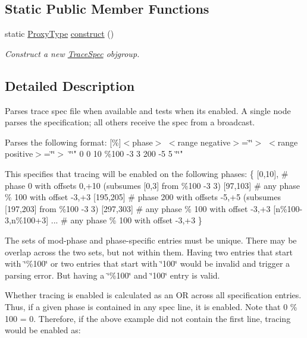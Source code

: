 \subsection*{Static Public Member Functions}
\begin{DoxyCompactItemize}
\item 
static \hyperlink{structvt_1_1trace_1_1file__spec_1_1_trace_spec_a26160cff9bb5115866943ed823405f1f}{Proxy\+Type} \hyperlink{structvt_1_1trace_1_1file__spec_1_1_trace_spec_a66e362b05b4af9a4e4ef514a4e272599}{construct} ()
\begin{DoxyCompactList}\small\item\em Construct a new {\ttfamily \hyperlink{structvt_1_1trace_1_1file__spec_1_1_trace_spec}{Trace\+Spec}} objgroup. \end{DoxyCompactList}\end{DoxyCompactItemize}


\subsection{Detailed Description}
Parses trace spec file when available and tests when its enabled. A single node parses the specification; all others receive the spec from a broadcast. 

Parses the following format\+: \mbox{[}\%\mbox{]}$<$phase$>$ $<$range negative$>$=\char`\"{}\char`\"{}$>$ $<$range positive$>$=\char`\"{}\char`\"{}$>$ \char`\"{}\char`\"{}" 0 0 10 \%100 -\/3 3 200 -\/5 5 \char`\"{}\char`\"{}"

This specifies that tracing will be enabled on the following phases\+: \{ \mbox{[}0,10\mbox{]}, \# phase 0 with offsets 0,+10 (subsumes \mbox{[}0,3\mbox{]} from \%100 -\/3 3) \mbox{[}97,103\mbox{]} \# any phase \% 100 with offset -\/3,+3 \mbox{[}195,205\mbox{]} \# phase 200 with offsets -\/5,+5 (subsumes \mbox{[}197,203\mbox{]} from \%100 -\/3 3) \mbox{[}297,303\mbox{]} \# any phase \% 100 with offset -\/3,+3 \mbox{[}n\%100-\/3,n\%100+3\mbox{]} ... \# any phase \% 100 with offset -\/3,+3 \}

The sets of mod-\/phase and phase-\/specific entries must be unique. There may be overlap across the two sets, but not within them. Having two entries that start with \char`\"{}\%100\char`\"{} or two entries that start with \char`\"{}100\char`\"{} would be invalid and trigger a parsing error. But having a \char`\"{}\%100\char`\"{} and \char`\"{}100\char`\"{} entry is valid.

Whether tracing is enabled is calculated as an OR across all specification entries. Thus, if a given phase is contained in any spec line, it is enabled. Note that 0 \% 100 = 0. Therefore, if the above example did not contain the first line, tracing would be enabled as\+:

